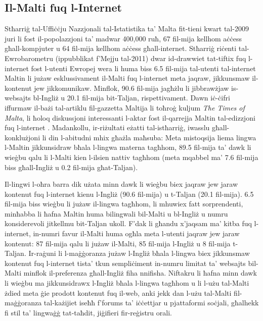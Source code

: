 \begin{multicols}{2}
\subsection{Il-Malti fuq l-Internet}

Stħarriġ tal-Uffiċċju Nazzjonali tal-Istatistika ta’ Malta fit-tieni kwart tal-2009 \cite{NSO2} juri li fost il-popolazzjoni ta’ madwar 400,000 ruħ, 67 fil-mija kellhom aċċess għall-kompjuter u 64 fil-mija kellhom aċċess għall-internet. Stħarriġ riċenti tal-Ewrobarometru (ippubblikat f'Mejju tal-2011) \cite{Eurobarometer1} dwar id-drawwiet tat-tiftix fuq l-internet fost l-utenti Ewropej wera li huma biss 6.5 fil-mija tal-utenti tal-internet Maltin li jużaw esklussivament il-Malti fuq l-internet meta jaqraw, jikkunsmaw il-kontenut jew jikkomunikaw. Minflok, 90.6 fil-mija jagħżlu li jibbrawżjaw is-websajts bl-Ingliż u 20.1 fil-mija bit-Taljan, rispettivament. Dawn iċ-ċifri iffurmaw il-bażi tal-artiklu fil-gazzetta Maltija li toħroġ kuljum \emph{The Times of Malta}, li ħoloq diskussjoni interessanti l-aktar fost il-qarrejja Maltin tal-edizzjoni fuq l-internet \cite{TimesOfMalta1}. 
Madankollu, ir-riżultati eżatti tal-istħarriġ, iwasslu għall-konklużjoni li din l-abitudni mhix għażla maħsuba: Meta mistoqsija liema lingwa l-Maltin jikkunsidraw bħala l-lingwa materna tagħhom, 89.5 fil-mija ta’ dawk li wieġbu qalu li l-Malti kien l-ilsien nattiv tagħhom (meta mqabbel ma’ 7.6 fil-mija biss għall-Ingliż u 0.2 fil-mija għat-Taljan).

Il-lingwi l-oħra barra dik użata minn dawk li wieġbu biex jaqraw jew jaraw kontenut fuq l-internet kienu l-Ingliż (90.6 fil-mija) u t-Taljan (20.1 fil-mija). 6.5 fil-mija biss wieġbu li jużaw il-lingwa tagħhom, li mhuwiex fatt sorprendenti, minħabba li ħafna Maltin huma bilingwali bil-Malti u bl-Ingliż u numru konsiderevoli jitkellmu bit-Taljan ukoll.
F’dak li għandu x’jaqsam ma’ kitba fuq l-internet, in-numri favur il-Malti huma ogħla meta l-utenti jaqraw jew jaraw kontenut: 87 fil-mija qalu li jużaw il-Malti, 85 fil-mija l-Ingliż u 8 fil-mija t-Taljan.
Ir-raġuni li l-maġġoranza jużaw l-Ingliż bħala l-lingwa biex jikkunsmaw kontenut fuq l-internet tista’ tkun sempliċiment in-numru limitat ta’ websajts bil-Malti minflok il-preferenza għall-Ingliż fiha nnifisha. Niftakru li ħafna minn dawk li wieġbu ma jikkunsidrawx l-Ingliż bħala l-lingwa tagħhom u li l-użu tal-Malti żdied meta ġie prodott kontenut fuq il-web, anki jekk dan l-użu tal-Malti fil-maġġoranza tal-każijiet iseħħ f’forums ta’ iċċettjar u pjattaformi soċjali, għalhekk fi stil ta’ lingwaġġ tat-taħdit, jiġifieri fir-reġistru orali.


\end{multicols}
